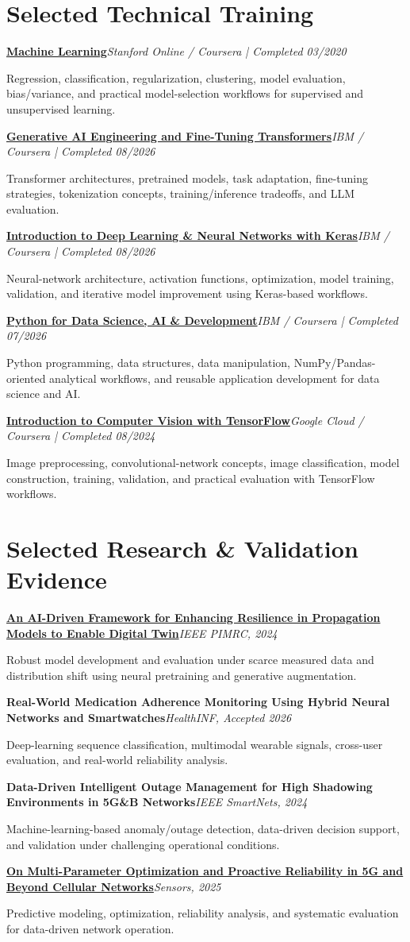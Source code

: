 \documentclass[10pt,letterpaper]{extarticle}
\newcommand{\cert}[3]{\Needspace{2\baselineskip}\textbf{#1}\hfill\textit{#2}\par{\small #3\par}}
\newcommand{\pub}[3]{\Needspace{2\baselineskip}\textbf{#1}\hfill\textit{#2}\par{\small #3\par}}
\begin{document}
\section{Selected Technical Training}
\cert{\href{https://www.coursera.org/account/accomplishments/verify/VU3Y5TBLVLZT}{Machine Learning}}{Stanford Online / Coursera | Completed 03/2020}{Regression, classification, regularization, clustering, model evaluation, bias/variance, and practical model-selection workflows for supervised and unsupervised learning.}
\cert{\href{https://www.coursera.org/account/accomplishments/verify/SG4GDJ4CLPVL}{Generative AI Engineering and Fine-Tuning Transformers}}{IBM / Coursera | Completed 08/2026}{Transformer architectures, pretrained models, task adaptation, fine-tuning strategies, tokenization concepts, training/inference tradeoffs, and LLM evaluation.}
\cert{\href{https://www.coursera.org/account/accomplishments/verify/Y6NP4GWLS4DZ}{Introduction to Deep Learning \& Neural Networks with Keras}}{IBM / Coursera | Completed 08/2026}{Neural-network architecture, activation functions, optimization, model training, validation, and iterative model improvement using Keras-based workflows.}
\cert{\href{https://www.coursera.org/account/accomplishments/verify/WRA89JEJU8EE}{Python for Data Science, AI \& Development}}{IBM / Coursera | Completed 07/2026}{Python programming, data structures, data manipulation, NumPy/Pandas-oriented analytical workflows, and reusable application development for data science and AI.}
\cert{\href{https://www.coursera.org/account/accomplishments/verify/R6248BNQAC0D}{Introduction to Computer Vision with TensorFlow}}{Google Cloud / Coursera | Completed 08/2024}{Image preprocessing, convolutional-network concepts, image classification, model construction, training, validation, and practical evaluation with TensorFlow workflows.}

\section{Selected Research \& Validation Evidence}
\pub{\href{https://doi.org/10.1109/PIMRC59610.2024.10817403}{An AI-Driven Framework for Enhancing Resilience in Propagation Models to Enable Digital Twin}}{IEEE PIMRC, 2024}{Robust model development and evaluation under scarce measured data and distribution shift using neural pretraining and generative augmentation.}
\pub{Real-World Medication Adherence Monitoring Using Hybrid Neural Networks and Smartwatches}{HealthINF, Accepted 2026}{Deep-learning sequence classification, multimodal wearable signals, cross-user evaluation, and real-world reliability analysis.}
\pub{Data-Driven Intelligent Outage Management for High Shadowing Environments in 5G\&B Networks}{IEEE SmartNets, 2024}{Machine-learning-based anomaly/outage detection, data-driven decision support, and validation under challenging operational conditions.}
\pub{\href{https://doi.org/10.3390/s25247651}{On Multi-Parameter Optimization and Proactive Reliability in 5G and Beyond Cellular Networks}}{Sensors, 2025}{Predictive modeling, optimization, reliability analysis, and systematic evaluation for data-driven network operation.}
\end{document}
